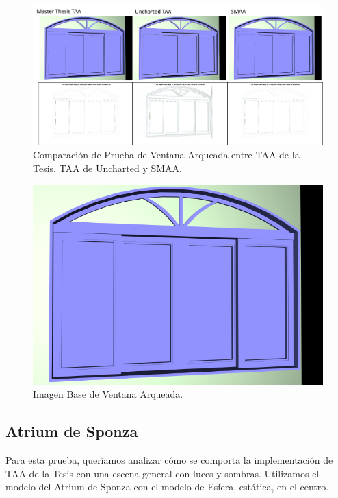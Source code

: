 \documentclass[pregrado]{tesis-usb} %
\begin{document}
\begin{figure}[!htb]
	\centering
	\includegraphics[scale=0.8]{images/results/window_arch.png}
	\caption{Comparación de Prueba de Ventana Arqueada entre TAA de la Tesis, TAA de Uncharted y SMAA.}\label{fig:window_arch_render}
\end{figure}

\begin{figure}[!htb]
	\centering
	\includegraphics[scale=0.18]{images/results/window_arch_sobel_ground_truth.png}
	\caption{Imagen Base de Ventana Arqueada.}\label{fig:window_arch_truth}
\end{figure}

\FloatBarrier

\subsection{Atrium de Sponza}
Para esta prueba, queríamos analizar cómo se comporta la implementación de TAA de la Tesis con una escena general con luces y sombras. Utilizamos el modelo del Atrium  de Sponza con el modelo de Esfera, estática, en el centro.
\end{document}
